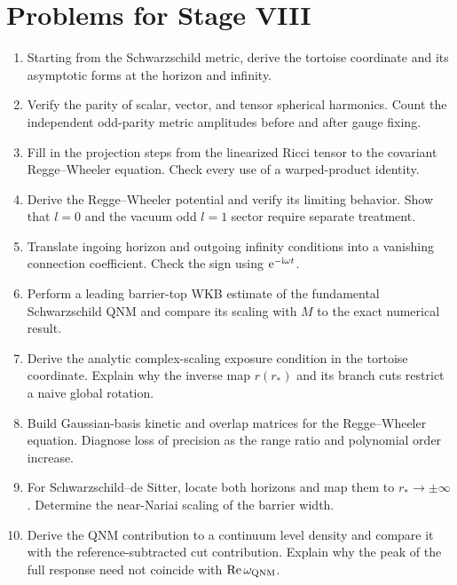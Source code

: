 \section{Problems for Stage VIII}
\label{problems:stage-VIII}

\begin{enumerate}[label=\textbf{VIII.\arabic*},leftmargin=*]
  \item Starting from the Schwarzschild metric, derive the tortoise
  coordinate and its asymptotic forms at the horizon and infinity.

  \item Verify the parity of scalar, vector, and tensor spherical harmonics.
  Count the independent odd-parity metric amplitudes before and after gauge
  fixing.

  \item Fill in the projection steps from the linearized Ricci tensor to the
  covariant Regge--Wheeler equation.  Check every use of a warped-product
  identity.

  \item Derive the Regge--Wheeler potential and verify its limiting behavior.
  Show that $l=0$ and the vacuum odd $l=1$ sector require separate treatment.

  \item Translate ingoing horizon and outgoing infinity conditions into a
  vanishing connection coefficient.  Check the sign using
  $\mathrm{e}^{-\mathrm{i}\omega t}$.

  \item Perform a leading barrier-top WKB estimate of the fundamental
  Schwarzschild QNM and compare its scaling with $M$ to the exact numerical
  result.

  \item Derive the analytic complex-scaling exposure condition in the
  tortoise coordinate.  Explain why the inverse map $r(r_*)$ and its branch
  cuts restrict a naive global rotation.

  \item Build Gaussian-basis kinetic and overlap matrices for the
  Regge--Wheeler equation.  Diagnose loss of precision as the range ratio and
  polynomial order increase.

  \item For Schwarzschild--de Sitter, locate both horizons and map them to
  $r_*\to\pm\infty$.  Determine the near-Nariai scaling of the barrier width.

  \item Derive the QNM contribution to a continuum level density and compare
  it with the reference-subtracted cut contribution.  Explain why the peak of
  the full response need not coincide with $\operatorname{Re}\omega_{\mathrm{QNM}}$.
\end{enumerate}
